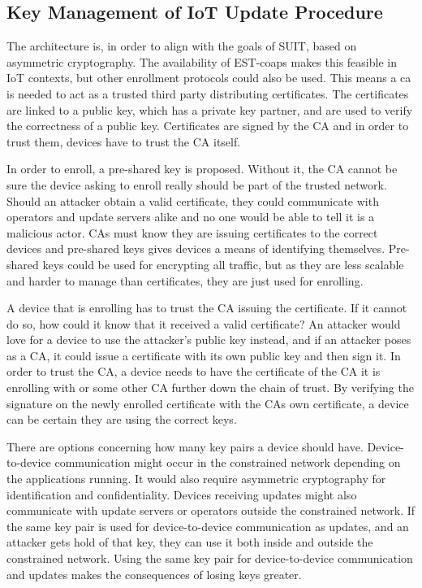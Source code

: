\documentclass[0-thesis.tex]{subfiles}
\begin{document}
\subsection{Key Management of IoT Update Procedure}
\label{ssec:key-management}
The architecture is, in order to align with the goals of SUIT, based on asymmetric
cryptography. The availability of EST-coaps makes this feasible in IoT contexts, but other
enrollment protocols could also be used. This means a \acrfull{ca} is needed to act as
a trusted third party distributing certificates. The certificates are linked to a public
key, which has a private key partner, and are used to verify the correctness of a public
key. Certificates are signed by the CA and in order to trust them, devices have to trust
the CA itself.

In order to enroll, a pre-shared key is proposed. Without it, the CA cannot be sure the
device asking to enroll really should be part of the trusted network. Should an attacker
obtain a valid certificate, they could communicate with operators and update servers alike
and no one would be able to tell it is a malicious actor. CAs must know they are issuing
certificates to the correct devices and pre-shared keys gives devices a means of
identifying themselves. Pre-shared keys could be used for encrypting all traffic, but as
they are less scalable and harder to manage than certificates, they are just used for
enrolling.

A device that is enrolling has to trust the CA issuing the certificate. If it cannot do
so, how could it know that it received a valid certificate? An attacker would love for a
device to use the attacker's public key instead, and if an attacker poses as a CA, it
could issue a certificate with its own public key and then sign it. In order to trust the
CA, a device needs to have the certificate of the CA it is enrolling with or some other CA
further down the chain of trust. By verifying the signature on the newly enrolled
certificate with the CAs own certificate, a device can be certain they are using the
correct keys.

There are options concerning how many key pairs a device should have. Device-to-device
communication might occur in the constrained network depending on the applications
running. It would also require asymmetric cryptography for identification and
confidentiality. Devices receiving updates might also communicate with update servers or
operators outside the constrained network. If the same key pair is used for
device-to-device communication as updates, and an attacker gets hold of that key, they can
use it both inside and outside the constrained network. Using the same key pair for
device-to-device communication and updates makes the consequences of losing keys greater. 
\end{document}
